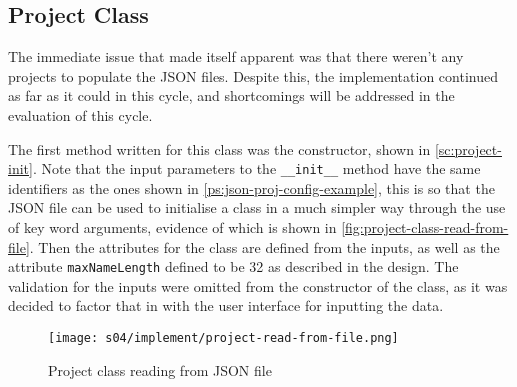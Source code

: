     \subsection{Project Class}
        The immediate issue that made itself apparent was that there weren't any projects to populate the JSON files. Despite this, the implementation continued as far as it could in this cycle, and shortcomings will be addressed in the evaluation of this cycle. 

        The first method written for this class was the constructor, shown in \autoref{sc:project-init}. 
        Note that the input parameters to the \verb|__init__| method have the same identifiers as the ones shown in \autoref{ps:json-proj-config-example}, this is so that the JSON file can be used to initialise a class in a much simpler way through the use of key word arguments, evidence of which is shown in \autoref{fig:project-class-read-from-file}.
        Then the attributes for the class are defined from the inputs, as well as the attribute \verb|maxNameLength| defined to be 32 as described in the design. 
        The validation for the inputs were omitted from the constructor of the class, as it was decided to factor that in with the user interface for inputting the data. 

        \begin{figure}[!ht]
            \centering
            \texttt{[image: s04/implement/project-read-from-file.png]}
            \caption{Project class reading from JSON file}
            \label{fig:project-class-read-from-file}
        \end{figure}

